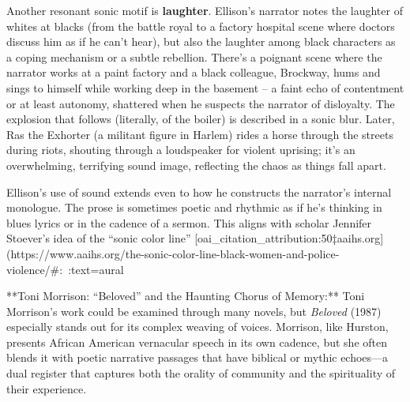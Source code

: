 \documentclass[12pt]{report}
\begin{document}
Another resonant sonic motif is \textbf{laughter}. Ellison’s narrator notes the laughter of whites at blacks (from the battle royal to a factory hospital scene where doctors discuss him as if he can’t hear), but also the laughter among black characters as a coping mechanism or a subtle rebellion. There’s a poignant scene where the narrator works at a paint factory and a black colleague, Brockway, hums and sings to himself while working deep in the basement – a faint echo of contentment or at least autonomy, shattered when he suspects the narrator of disloyalty. The explosion that follows (literally, of the boiler) is described in a sonic blur. Later, Ras the Exhorter (a militant figure in Harlem) rides a horse through the streets during riots, shouting through a loudspeaker for violent uprising; it’s an overwhelming, terrifying sound image, reflecting the chaos as things fall apart.

Ellison’s use of sound extends even to how he constructs the narrator’s internal monologue. The prose is sometimes poetic and rhythmic as if he’s thinking in blues lyrics or in the cadence of a sermon. This aligns with scholar Jennifer Stoever’s idea of the “sonic color line” [oai_citation_attribution:50‡aaihs.org](https://www.aaihs.org/the-sonic-color-line-black-women-and-police-violence/#:~:text=aural%

**Toni Morrison: “Beloved” and the Haunting Chorus of Memory:** Toni Morrison’s work could be examined through many novels, but \textit{Beloved} (1987) especially stands out for its complex weaving of voices. Morrison, like Hurston, presents African American vernacular speech in its own cadence, but she often blends it with poetic narrative passages that have biblical or mythic echoes—a dual register that captures both the orality of community and the spirituality of their experience.
\end{document}
